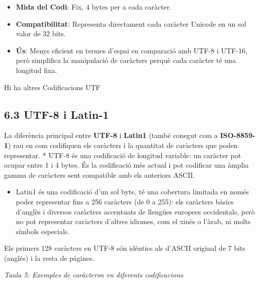 \documentclass[
  12 pt,
  a4paper,
]{article}
\providecommand{\tightlist}{%
  \setlength{\itemsep}{0pt}\setlength{\parskip}{0pt}}
\begin{document}
\begin{itemize}
\tightlist
\item
  \textbf{Mida del Codi}: Fix, 4 bytes per a cada caràcter.
\item
  \textbf{Compatibilitat}: Representa directament cada caràcter Unicode
  en un sol valor de 32 bits.
\item
  \textbf{Ús}: Menys eficient en termes d'espai en comparació amb UTF-8
  i UTF-16, però simplifica la manipulació de caràcters perquè cada
  caràcter té una longitud fixa.
\end{itemize}

Hi ha altres Codificacions UTF

\subsection{6.3 UTF-8 i Latin-1}\label{utf-8-i-latin-1}

La diferència principal entre \textbf{UTF-8} i \textbf{Latin1} (també
conegut com a \textbf{ISO-8859-1}) rau en com codifiquen els caràcters i
la quantitat de caràcters que poden representar. * UTF-8 és una
codificació de longitud variable: un caràcter pot ocupar entre 1 i 4
bytes. És la codificació més actual i pot codificar una àmplia gamma de
caràcters sent compatible amb els anteriors ASCII.

\begin{itemize}
\tightlist
\item
  Latin1 és una codificació d'un sol byte, té una cobertura limitada en
  només poder representar fins a 256 caràcters (de 0 a 255): els
  caràcters bàsics d'anglès i diversos caràcters accentuats de llengües
  europees occidentals, però no pot representar caràcters d'altres
  idiomes, com el xinès o l'àrab, ni molts símbols especials.
\end{itemize}

Els primers 128 caràcters en UTF-8 són idèntics als d'ASCII original de
7 bits (anglés) i la resta de pàgines.

\emph{Taula 5: Exemples de caràctersn en diferents codificacions}
\end{document}
